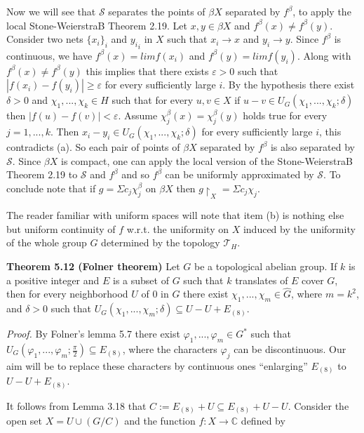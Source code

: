 \documentclass[12pt]{article}
\begin{document}
Now we will see that $\mathcal{S}$ separates the points of $\beta X$ separated by $f^{\beta}$, to apply the local Stone-WeierstraB
Theorem 2.19. Let $x, y \in \beta X$ and $f^{\beta}(x) \neq f^\beta(y)$. Consider two nets $\{x_i\}_i$ and ${y_i}_i$ in $X$ such that $x_i \to x$ and
$y_i \to y$. Since $f^\beta$ is continuous, we have $f^\beta(x) = lim f(x_i)$ and $f^\beta(y) = lim f(y_i)$. Along with $f^\beta(x) \neq f^\beta(y)$ this
implies that there exists $\varepsilon > 0$ such that $|f(x_i)-f(y_i)| \geq \varepsilon$ for every sufficiently large $i$. By the hypothesis there
exist $\delta > 0$ and $\chi_1, . . . , \chi_k \in H$ such that for every $u, v \in X$ if $u - v \in U_G(\chi_1, . . . , \chi_k; \delta)$ then $|f(u) - f(v)| < \varepsilon$.
Assume $\chi^\beta_j(x) = \chi^\beta_j(y)$ holds true for every $j = 1, . . . , k$. Then $x_i - y_i \in U_G(\chi_1, . . . , \chi_k; \delta)$ for every sufficiently
large $i$, this contradicts (a). So each pair of points of $\beta X$ separated by $f^\beta$ is also separated by $\mathcal{S}$. Since $\beta X$ is
compact, one can apply the local version of the Stone-WeierstraB Theorem 2.19 to $\mathcal{S}$ and $f^\beta$ and so $f^\beta$ can be
uniformly approximated by $\mathcal{S}$. To conclude note that if $g =\Sigma c_j \chi^\beta_j$ on $\beta X$ then $g \upharpoonright_X =\Sigma c_j \chi_j$.


The reader familiar with uniform spaces will note that item (b) is nothing else but uniform continuity of $f$
w.r.t. the uniformity on $X$ induced by the uniformity of the whole group $G$ determined by the topology $\mathcal{T}_H$.


\textbf{Theorem 5.12 (Folner theorem)} Let $G$ be a topological abelian group. If $k$ is a positive integer and $E$
is a subset of $G$ such that $k$ translates of $E$ cover $G$, then for every neighborhood $U$ of 0 in $G$ there exist
$\chi_1, . . . , \chi_m \in \hat{G}$, where $m = k^2$, and $\delta > 0$ such that $U_G(\chi_1, . . . , \chi_m; \delta) \subseteq U - U + E_{(8)}$.


\emph{Proof.} By Folner's lemma 5.7 there exist $\varphi_1, . . . , \varphi_m \in G^*$ such that $U_G(\varphi_1, . . . , \varphi_m; \frac{\pi}{2}) \subseteq E_{(8)}$, where the
characters $\varphi_j$ can be discontinuous. Our aim will be to replace these characters by continuous ones “enlarging”
$E_{(8)}$ to $U - U + E_{(8)}$.


It follows from Lemma 3.18 that $C := E_{(8)} + U \subseteq E_{(8)} + U - U$. Consider the open set $X = U \cup (G / C)$
and the function $f : X \to \mathbb{C}$ defined by
\end{document}
